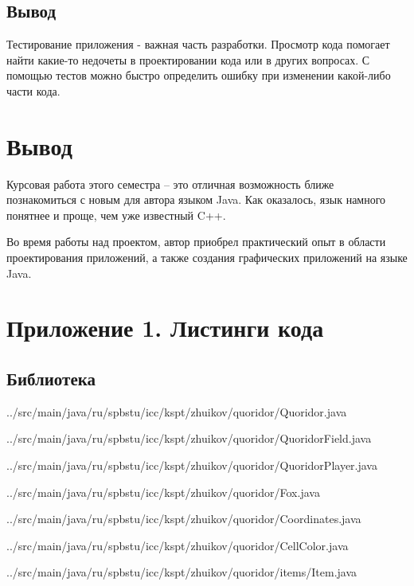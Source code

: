 \documentclass[a4paper]{article}
\begin{document}
\subsection{Вывод}
Тестирование приложения - важная часть разработки. Просмотр кода помогает найти какие-то недочеты в проектировании кода или в других вопросах. С помощью тестов можно быстро определить ошибку при изменении какой-либо части кода.

\section{Вывод}
Курсовая работа этого семестра – это отличная возможность ближе познакомиться с новым для автора языком Java. Как оказалось, язык намного понятнее и проще, чем уже известный C++.


Во время работы над проектом, автор приобрел практический опыт в области проектирования приложений, а также создания графических приложений на языке Java. 

\section{Приложение 1. Листинги кода}
\subsection{Библиотека}

{../src/main/java/ru/spbstu/icc/kspt/zhuikov/quoridor/Quoridor.java}
\newpage


{../src/main/java/ru/spbstu/icc/kspt/zhuikov/quoridor/QuoridorField.java}
\newpage


{../src/main/java/ru/spbstu/icc/kspt/zhuikov/quoridor/QuoridorPlayer.java}
\newpage


{../src/main/java/ru/spbstu/icc/kspt/zhuikov/quoridor/Fox.java}
\newpage


{../src/main/java/ru/spbstu/icc/kspt/zhuikov/quoridor/Coordinates.java}
\newpage


{../src/main/java/ru/spbstu/icc/kspt/zhuikov/quoridor/CellColor.java}
\newpage


{../src/main/java/ru/spbstu/icc/kspt/zhuikov/quoridor/items/Item.java}
\end{document}
